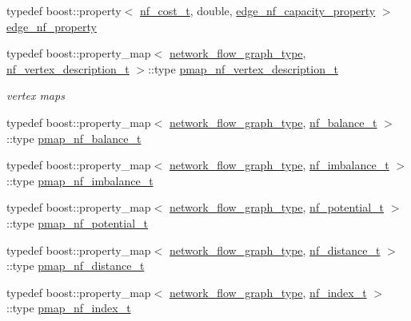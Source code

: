 \begin{DoxyCompactItemize}
\item 
typedef boost\+::property$<$ \hyperlink{structnetwork__flow_1_1nf__cost__t}{nf\+\_\+cost\+\_\+t}, double, \hyperlink{classnetwork__flow_a94cd5febfd01e9a9d40fec1ce816632a}{edge\+\_\+nf\+\_\+capacity\+\_\+property} $>$ \hyperlink{classnetwork__flow_a09cdef033c08baeb9ef03c21f0a5947d}{edge\+\_\+nf\+\_\+property}
\item 
typedef boost\+::property\+\_\+map$<$ \hyperlink{classnetwork__flow_abfdb8d1baba183c2b121f8c078b9b640}{network\+\_\+flow\+\_\+graph\+\_\+type}, \hyperlink{structnetwork__flow_1_1nf__vertex__description__t}{nf\+\_\+vertex\+\_\+description\+\_\+t} $>$\+::type \hyperlink{classnetwork__flow_a74ecf4431065049cd8c880b82b2b1a2c}{pmap\+\_\+nf\+\_\+vertex\+\_\+description\+\_\+t}
\begin{DoxyCompactList}\small\item\em vertex maps \end{DoxyCompactList}\item 
typedef boost\+::property\+\_\+map$<$ \hyperlink{classnetwork__flow_abfdb8d1baba183c2b121f8c078b9b640}{network\+\_\+flow\+\_\+graph\+\_\+type}, \hyperlink{structnetwork__flow_1_1nf__balance__t}{nf\+\_\+balance\+\_\+t} $>$\+::type \hyperlink{classnetwork__flow_adb6c2e7def8309b3a5f660dd40a758e8}{pmap\+\_\+nf\+\_\+balance\+\_\+t}
\item 
typedef boost\+::property\+\_\+map$<$ \hyperlink{classnetwork__flow_abfdb8d1baba183c2b121f8c078b9b640}{network\+\_\+flow\+\_\+graph\+\_\+type}, \hyperlink{structnetwork__flow_1_1nf__imbalance__t}{nf\+\_\+imbalance\+\_\+t} $>$\+::type \hyperlink{classnetwork__flow_a5760a4393bb7caf9af993443e209de05}{pmap\+\_\+nf\+\_\+imbalance\+\_\+t}
\item 
typedef boost\+::property\+\_\+map$<$ \hyperlink{classnetwork__flow_abfdb8d1baba183c2b121f8c078b9b640}{network\+\_\+flow\+\_\+graph\+\_\+type}, \hyperlink{structnetwork__flow_1_1nf__potential__t}{nf\+\_\+potential\+\_\+t} $>$\+::type \hyperlink{classnetwork__flow_a27c9b52e67a89ed0f6584017fdf365a5}{pmap\+\_\+nf\+\_\+potential\+\_\+t}
\item 
typedef boost\+::property\+\_\+map$<$ \hyperlink{classnetwork__flow_abfdb8d1baba183c2b121f8c078b9b640}{network\+\_\+flow\+\_\+graph\+\_\+type}, \hyperlink{structnetwork__flow_1_1nf__distance__t}{nf\+\_\+distance\+\_\+t} $>$\+::type \hyperlink{classnetwork__flow_a2341f0fc871494e5fa44bc4fe5967a0e}{pmap\+\_\+nf\+\_\+distance\+\_\+t}
\item 
typedef boost\+::property\+\_\+map$<$ \hyperlink{classnetwork__flow_abfdb8d1baba183c2b121f8c078b9b640}{network\+\_\+flow\+\_\+graph\+\_\+type}, \hyperlink{structnetwork__flow_1_1nf__index__t}{nf\+\_\+index\+\_\+t} $>$\+::type \hyperlink{classnetwork__flow_a8f87f8e2ed2e6d081d66eba9ea1b284c}{pmap\+\_\+nf\+\_\+index\+\_\+t}

\end{DoxyCompactItemize}
